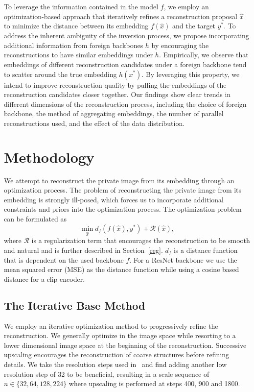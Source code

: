 \documentclass[10pt,twocolumn]{article}
\begin{document}
To leverage the information contained in the model $f$, we employ an optimization-based approach that iteratively refines a reconstruction proposal $\hat{x}$ to minimize the distance between its embedding $f(\hat{x})$ and the target $y^*$.
To address the inherent ambiguity of the inversion process, we propose incorporating additional information from foreign backbones $h$ by encouraging the reconstructions to have similar embeddings under $h$.
Empirically, we observe that embeddings of different reconstruction candidates under a foreign backbone tend to scatter around the true embedding $h(x^*)$.
By leveraging this property, we intend to improve reconstruction quality by pulling the embeddings of the reconstruction candidates closer together.
Our findings show clear trends in different dimensions of the reconstruction process, including the choice of foreign backbone, the method of aggregating embeddings, the number of parallel reconstructions used, and the effect of the data distribution.

\section{Methodology}
We attempt to reconstruct the private image from its embedding through an optimization process.
The problem of reconstructing the private image from its embedding is strongly ill-posed, which forces us to incorporate additional constraints and priors into the optimization process.
The optimization problem can be formulated as
$$
\min_{\hat{x}} d_f(f(\hat{x}), y^*) + \mathcal{R}(\hat{x}),
$$
where $\mathcal{R}$ is a regularization term that encourages the reconstruction to be smooth and natural and is further described in Section~\ref{reg}.
$d_f$ is a distance function that is dependent on the used backbone $f$.
For a ResNet backbone we use the mean squared error (MSE) as the distance function while using a cosine based distance for a clip encoder.
\subsection{The Iterative Base Method}\label{base_method}
We employ an iterative optimization method to progressively refine the reconstruction.
We generally optimize in the image space while resorting to a lower dimensional image space at the beginning of the reconstruction.
Successive upscaling encourages the reconstruction of coarse structures before refining details.
We take the resolution steps used in~\cite{kazemiWhatWeLearn2024} and find adding another low resolution step of 32 to be beneficial, resulting in a scale sequence of $n\in\{32, 64, 128, 224\}$ where upscaling is performed at steps 400, 900 and 1800.
\end{document}
